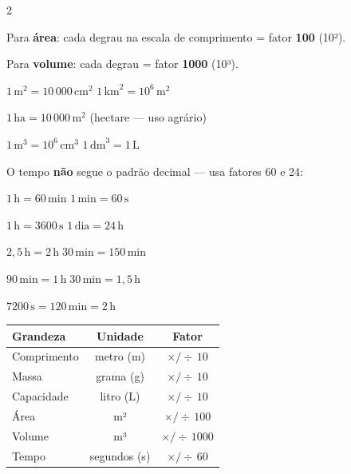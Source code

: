 \documentclass[12pt]{article}
\begin{document}
\begin{multicols}{2}

Para \textbf{área}: cada degrau na escala de comprimento = fator \textbf{100} (10²).

Para \textbf{volume}: cada degrau = fator \textbf{1000} (10³).


$1\,\text{m}^2 = 10\,000\,\text{cm}^2$ \quad $1\,\text{km}^2 = 10^6\,\text{m}^2$

$1\,\text{ha} = 10\,000\,\text{m}^2$ \hfill {\small(hectare — uso agrário)}


$1\,\text{m}^3 = 10^6\,\text{cm}^3$ \quad $1\,\text{dm}^3 = 1\,\text{L}$



O tempo \textbf{não} segue o padrão decimal — usa fatores 60 e 24:

$1\,\text{h} = 60\,\text{min}$ \qquad $1\,\text{min} = 60\,\text{s}$

$1\,\text{h} = 3600\,\text{s}$ \qquad $1\,\text{dia} = 24\,\text{h}$


$2{,}5\,\text{h} = 2\,\text{h}\;30\,\text{min} = 150\,\text{min}$

$90\,\text{min} = 1\,\text{h}\;30\,\text{min} = 1{,}5\,\text{h}$

$7200\,\text{s} = 120\,\text{min} = 2\,\text{h}$


\begin{center}
\renewcommand{\arraystretch}{1.3}
\begin{tabular}{|l|c|c|}
\hline
\textbf{Grandeza} & \textbf{Unidade} & \textbf{Fator} \\ \hline
Comprimento & metro (m) & $\times/\div\,10$ \\ \hline
Massa & grama (g) & $\times/\div\,10$ \\ \hline
Capacidade & litro (L) & $\times/\div\,10$ \\ \hline
Área & m² & $\times/\div\,100$ \\ \hline
Volume & m³ & $\times/\div\,1000$ \\ \hline
Tempo & segundos (s) & $\times/\div\,60$ \\ \hline
\end{tabular}
\end{center}

\end{multicols}

\end{document}
